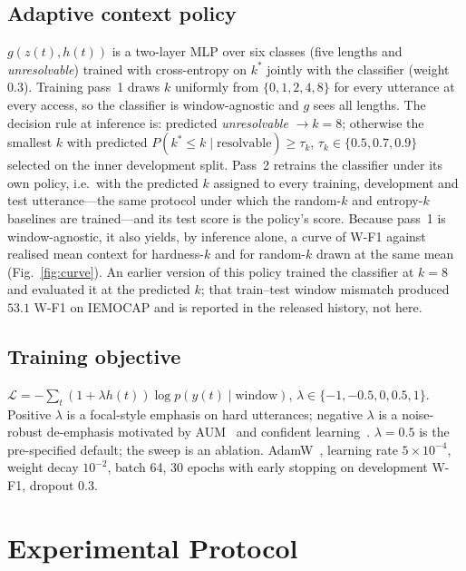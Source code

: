\documentclass[journal]{IEEEtran}
\newcommand{\wf}{W-F1}
\begin{document}
\subsection{Adaptive context policy}\label{sec:policy}
$g(z(t), h(t))$ is a two-layer MLP over six classes (five lengths and \emph{unresolvable}) trained with cross-entropy on $k^*$ jointly with the classifier (weight 0.3). Training pass~1 draws $k$ uniformly from $\{0,1,2,4,8\}$ for every utterance at every access, so the classifier is window-agnostic and $g$ sees all lengths. The decision rule at inference is: predicted \emph{unresolvable} $\rightarrow k = 8$; otherwise the smallest $k$ with predicted $P(k^* \leq k \mid \text{resolvable}) \geq \tau_k$, $\tau_k \in \{0.5, 0.7, 0.9\}$ selected on the inner development split. Pass~2 retrains the classifier under its own policy, i.e.\ with the predicted $k$ assigned to every training, development and test utterance---the same protocol under which the random-$k$ and entropy-$k$ baselines are trained---and its test score is the policy's score. Because pass~1 is window-agnostic, it also yields, by inference alone, a curve of \wf{} against realised mean context for hardness-$k$ and for random-$k$ drawn at the same mean (Fig.~\ref{fig:curve}). An earlier version of this policy trained the classifier at $k = 8$ and evaluated it at the predicted $k$; that train--test window mismatch produced $53.1$ \wf{} on IEMOCAP and is reported in the released history, not here.

\subsection{Training objective}
$\mathcal{L} = -\sum_t (1 + \lambda h(t)) \log p(y(t) \mid \text{window})$, $\lambda \in \{-1, -0.5, 0, 0.5, 1\}$. Positive $\lambda$ is a focal-style emphasis on hard utterances; negative $\lambda$ is a noise-robust de-emphasis motivated by AUM~\cite{pleiss2020aum} and confident learning~\cite{northcutt2021confident}. $\lambda = 0.5$ is the pre-specified default; the sweep is an ablation. AdamW~\cite{loshchilov2019adamw}, learning rate $5\times10^{-4}$, weight decay $10^{-2}$, batch 64, 30 epochs with early stopping on development \wf, dropout 0.3.

\section{Experimental Protocol}\label{sec:protocol}
\end{document}
